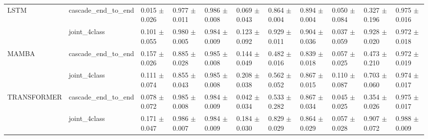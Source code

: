 \begin{table}
\begin{tabular}{lllllllllll}
LSTM & cascade_end_to_end &  0.015 $\pm$ 0.026 &  0.977 $\pm$ 0.011 &          0.986 $\pm$ 0.008 &  0.069 $\pm$ 0.043 &  0.864 $\pm$ 0.004 &          0.894 $\pm$ 0.004 &  0.050 $\pm$ 0.084 &  0.327 $\pm$ 0.196 &          0.975 $\pm$ 0.016 \\
            & joint_4class &  0.101 $\pm$ 0.055 &  0.980 $\pm$ 0.005 &          0.984 $\pm$ 0.009 &  0.123 $\pm$ 0.092 &  0.929 $\pm$ 0.011 &          0.904 $\pm$ 0.036 &  0.037 $\pm$ 0.059 &  0.928 $\pm$ 0.020 &          0.972 $\pm$ 0.018 \\
MAMBA & cascade_end_to_end &  0.157 $\pm$ 0.026 &  0.885 $\pm$ 0.028 &          0.985 $\pm$ 0.008 &  0.144 $\pm$ 0.049 &  0.482 $\pm$ 0.016 &          0.839 $\pm$ 0.018 &  0.057 $\pm$ 0.025 &  0.473 $\pm$ 0.210 &          0.972 $\pm$ 0.019 \\
            & joint_4class &  0.111 $\pm$ 0.074 &  0.855 $\pm$ 0.043 &          0.985 $\pm$ 0.008 &  0.208 $\pm$ 0.038 &  0.562 $\pm$ 0.052 &          0.867 $\pm$ 0.015 &  0.110 $\pm$ 0.087 &  0.703 $\pm$ 0.060 &          0.974 $\pm$ 0.017 \\
TRANSFORMER & cascade_end_to_end &  0.078 $\pm$ 0.072 &  0.985 $\pm$ 0.008 &          0.984 $\pm$ 0.009 &  0.042 $\pm$ 0.034 &  0.533 $\pm$ 0.282 &          0.867 $\pm$ 0.034 &  0.045 $\pm$ 0.025 &  0.354 $\pm$ 0.026 &          0.975 $\pm$ 0.017 \\
            & joint_4class &  0.171 $\pm$ 0.047 &  0.986 $\pm$ 0.007 &          0.984 $\pm$ 0.009 &  0.184 $\pm$ 0.030 &  0.829 $\pm$ 0.029 &          0.864 $\pm$ 0.029 &  0.057 $\pm$ 0.028 &  0.907 $\pm$ 0.072 &          0.988 $\pm$ 0.009 \\
\bottomrule
\end{tabular}
\end{table}

